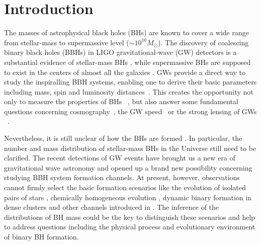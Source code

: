 \documentclass[twocolumn]{aastex62}
\newcommand{\kai}[1]{\textcolor{red}{[{\bf Kai}: #1]}}
\begin{document}

\section{Introduction} \label{sec_intro}

The masses of astrophysical black holes (BHs) are known to cover a wide range from stellar-mass to supermassive level ($\sim10^{10} M_{\odot}$). The discovery of 
coalescing binary black holes (BBHs) in LIGO gravitational-wave (GW) detectors is a substantial evidence of stellar-mass BHs \citep{Abbott2016}, while supermassive BHs are supposed to exist in the centers of almost all the galaxies \citep{Lynden-Bell1969, Kormendy1995}. 
GWs provide a direct way to study the inspiralling BBH systems, enabling one to derive their basic parameters including mass, spin and luminosity distances~\citep{Abbott2017phy, Abbott2018}. This creates the opportunity not only to measure the properties of BHs ~\citep{Abbott2018b}, but also answer some fundamental questions concerning cosmography~\citep{Liao2017, Ding2019, Cai2017}, the GW speed~\citep{Fan2017, Collett2017} or the strong lensing of GWs ~\citep{Ola2013, Biesiada2014, Ding2015}. %

Nevertheless, it is still unclear of how the BHs are formed \citep{Fryer1999, Fryer2001, Mirabel2016}. In particular, the number and mass distribution of stellar-mass BHs in the Universe still need to be clarified.
The recent detections of GW events have brought us a new era of gravitational wave astronomy \citep[e.g.,][]{Abbott2016, Abbott2016_sum, Abbott2018} and opened up a  brand new possibility concerning studying BBH system formation channels. 
At present, however, observations cannot firmly select the basic formation scenarios like the evolution of isolated pairs of stars \citep{Bethe1998, Portegies1998}, chemically homogeneous evolution \citep{Marchant2016, deMink2016}, dynamic binary formation in dense clusters \citep{Portegies2000, Kulkarni1993} and other channels introduced in \citet{Abbott2018b}.
The inference of the distributions of BH mass could be the key to distinguish these scenarios and help to address questions including the physical process and evolutionary environment of binary BH formation.
\end{document}
